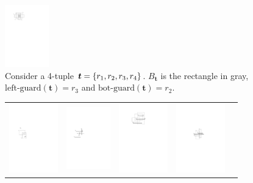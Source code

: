 \documentclass[sigconf]{acmart}
\def\figcapup{\vspace{-2mm}}
\def\figcapdown{\vspace{-2mm}}
\def\gleft{\mathrm{left\text{-}guard}}
\def\gbot{\mathrm{bot\text{-}guard}}
\begin{document}
\begin{figure}
    \includegraphics[height=27mm]{./artwork/guard}

    \figcapup
    \caption{Consider a 4-tuple $\textrm{\boldmath${t}$} = \{r_1, r_2, r_3, r_4\}$. $B_\bm{t}$ is the rectangle in gray, $\gleft(\bm{t}) = r_3$ and $\gbot(\bm{t}) = r_2$.}
    \label{fig:guard}
    \figcapdown
\end{figure}


\begin{figure}
    \begin{tabular}{ccccc}
        \includegraphics[height=30mm]{./artwork/prob-a} & 
        \hspace{3mm}
        \includegraphics[height=27mm]{./artwork/prob-b} &
        \hspace{3mm}
        \includegraphics[height=30mm]{./artwork/prob-c} &
        \hspace{3mm}
        \includegraphics[height=30mm]{./artwork/prob-d} &

\end{tabular}
\end{figure}
\end{document}
